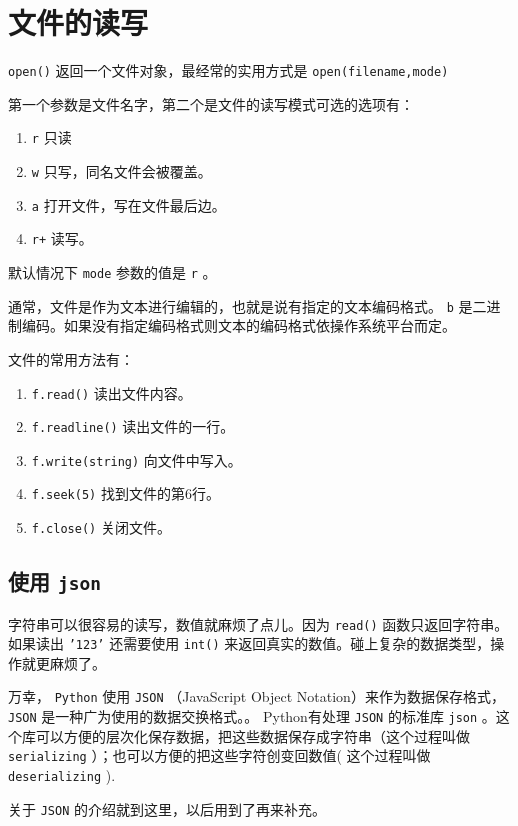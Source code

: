 \documentclass[10pt,a4paper,UTF8]{article}
\begin{document}
\section{文件的读写}
\label{sec:orgafd3fe2}


\texttt{open()} 返回一个文件对象，最经常的实用方式是 \texttt{open(filename,mode)}

第一个参数是文件名字，第二个是文件的读写模式可选的选项有：
\begin{enumerate}
\item \texttt{r} 只读
\item \texttt{w} 只写，同名文件会被覆盖。
\item \texttt{a} 打开文件，写在文件最后边。
\item \texttt{r+} 读写。
\end{enumerate}

默认情况下 \texttt{mode} 参数的值是 \texttt{r} 。

通常，文件是作为文本进行编辑的，也就是说有指定的文本编码格式。 \texttt{b} 是二进制编码。如果没有指定编码格式则文本的编码格式依操作系统平台而定。

文件的常用方法有： 
\begin{enumerate}
\item \texttt{f.read()} 读出文件内容。
\item \texttt{f.readline()} 读出文件的一行。
\item \texttt{f.write(string)} 向文件中写入。
\item \texttt{f.seek(5)} 找到文件的第6行。
\item \texttt{f.close()} 关闭文件。
\end{enumerate}
\subsection{使用 \texttt{json}}
\label{sec:org760b4d3}


字符串可以很容易的读写，数值就麻烦了点儿。因为 \texttt{read()} 函数只返回字符串。如果读出 \texttt{'123'} 还需要使用 \texttt{int()} 来返回真实的数值。碰上复杂的数据类型，操作就更麻烦了。

万幸， \texttt{Python} 使用 \texttt{JSON} （JavaScript Object Notation）来作为数据保存格式， \texttt{JSON} 是一种广为使用的数据交换格式。。 Python有处理 \texttt{JSON} 的标准库 \texttt{json} 。这个库可以方便的层次化保存数据，把这些数据保存成字符串（这个过程叫做 \texttt{serializing} ）；也可以方便的把这些字符创变回数值( 这个过程叫做 \texttt{deserializing}  ).  

关于 \texttt{JSON} 的介绍就到这里，以后用到了再来补充。
\end{document}
